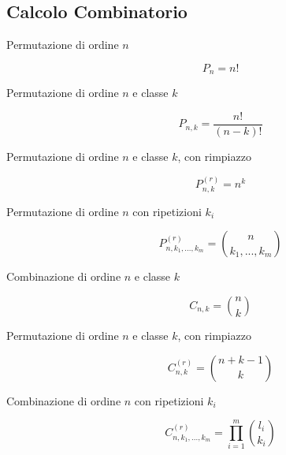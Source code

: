 \subsection{Calcolo Combinatorio}
\begin{description}
	
	\item[Permutazione di ordine $n$]
	\begin{equation}
	P_{n}=n!
	\end{equation}
	
	\item[Permutazione di ordine $n$ e classe $k$]
	\begin{equation}
	P_{n,k}=\frac{n!}{(n-k)!}
	\end{equation}
	
	\item[Permutazione di ordine $n$ e classe $k$, con rimpiazzo]
	\begin{equation}
	P_{n,k}^{(r)}=n^{k}
	\end{equation}
	
	\item[Permutazione di ordine $n$ con ripetizioni $k_{i}$]
	\begin{equation}
	P_{n,k_{1},...,k_{m}}^{(r)}=\binom{n}{k_{1},...,k_{m}}
	\end{equation}
	
	\item[Combinazione di ordine $n$ e classe $k$]
	\begin{equation}
	C_{n,k}=\binom{n}{k}
	\end{equation}
	
	\item[Permutazione di ordine $n$ e classe $k$, con rimpiazzo]
	\begin{equation}
	C_{n,k}^{(r)}=\binom{n+k-1}{k}
	\end{equation}
	
	\item[Combinazione di ordine $n$ con ripetizioni $k_{i}$]
	\begin{equation}
	C_{n,k_{1},...,k_{m}}^{(r)}=\prod_{i=1}^{m}\binom{l_{i}}{k_{i}}
	\end{equation}
	
\end{description}

\newpage

